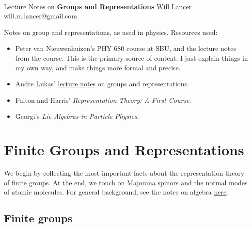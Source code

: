 \documentclass[11pt]{article}
\begin{document}
\thispagestyle{empty}
\bigskip \
\vspace{0.1cm}

\begin{center}
{\fontsize{22}{22} \selectfont Lecture Notes on}
\vskip 16pt
{\fontsize{36}{36} \selectfont \bf \sffamily Groups and Representations}
\vskip 24pt
{\fontsize{18}{18} \selectfont \rmfamily \href{https://will-lancer.github.io}{Will Lancer}} 
\vskip 6pt
{\fontsize{14}{14} \selectfont \ttfamily will.m.lancer@gmail.com} 
\vskip 24pt
\end{center}

{\parindent0pt \baselineskip=15.5pt}
\noin
Notes on group and representations, as used in physics. Resources used:
\begin{itemize}
    \item Peter van Nieuwenhuizen's PHY 680 course at SBU,
    and the lecture notes from the course. This is the primary
    source of content; I just explain things in my own way, and
    make things more formal and precise.
    \item Andre Lukas' 
    \href{https://www-thphys.physics.ox.ac.uk/people/AndreLukas/GroupsandRepresentations/groupsrepslecturenotes.pdf}{lecture notes} 
    on groups and representations.
    \item Fulton and Harris' \emph{Representation Theory: A First Course}.
    \item Georgi's \emph{Lie Algebras in Particle Physics}.
\end{itemize}
\newpage
\microtoc
\newpage


\section{Finite Groups and Representations}

We begin by collecting the most important facts about the representation
theory of finite groups. At the end, we touch on Majorana spinors and the normal
modes of atomic molecules. For general background, see the notes on
algebra \href{https://github.com/will-lancer/notes/blob/main/Mathematics/Algebra/Algebra.pdf}{here}.

\subsection{Finite groups}
\end{document}
